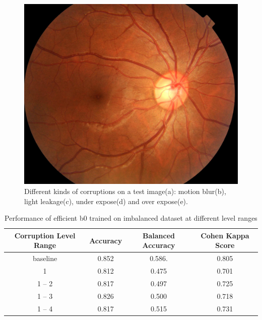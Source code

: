 \documentclass[../main.tex]{subfiles}
\begin{document}
\begin{figure}[htbp]
\begin{minipage}{5cm}
\includegraphics[width=1\linewidth]{testimage_augmented__14.jpg}
\subcaption{}
\end{minipage}
\caption{Different kinds of corruptions on a test image(a): motion blur(b), light leakage(c), under expose(d) and over expose(e).}
\label{fig:corruptions}
\end{figure}

\begin{table}[htbp]
\linespread{1.5} 
\renewcommand\arraystretch{1.25}
\centering
\begin{tabular}{|c|c|c|c|}
    \hline
     Corruption Level Range& Accuracy & Balanced Accuracy & Cohen Kappa Score\\
     \hline
     baseline & 0.852 & 0.586. & 0.805 \\
     \hline
     1 & 0.812 & 0.475 & 0.701   \\
     \hline
     1 -- 2& 0.817 & 0.497 & 0.725\\
     \hline
     1 -- 3& 0.826 & 0.500 & 0.718  \\
     \hline
     1 -- 4& 0.817 & 0.515 & 0.731 \\
     \hline
\end{tabular}
\caption{Performance of efficient b0 trained on imbalanced dataset at different level ranges}
\label{tab:corruptions_imbalanced}
\end{table}
\end{document}
